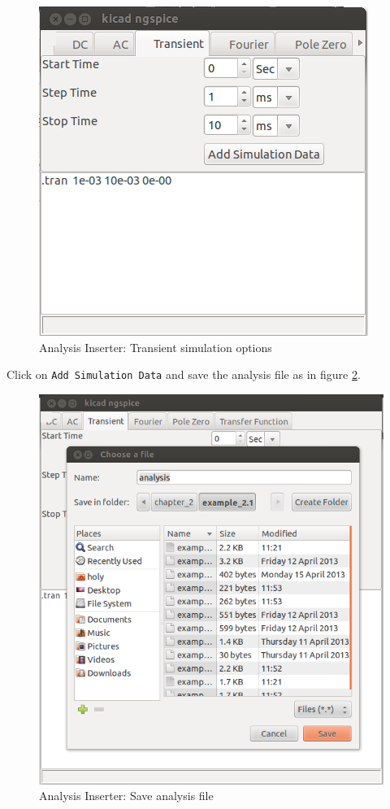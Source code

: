 \begin{enumerate}
\begin{figure}%
\begin{center}
\includegraphics[width=0.7\linewidth]{figures/apd7.png}%
\caption{Analysis Inserter: Transient simulation options}
\label{apd7}
\end{center}
\end{figure}
Click on {\tt Add Simulation Data} and save the analysis file as in figure \ref{apd8}.

\begin{figure}%
\begin{center}
\includegraphics[width=0.7\linewidth]{figures/apd8.png}%
\caption{Analysis Inserter: Save analysis file}
\label{apd8}
\end{center}
\end{figure}


\end{enumerate}
